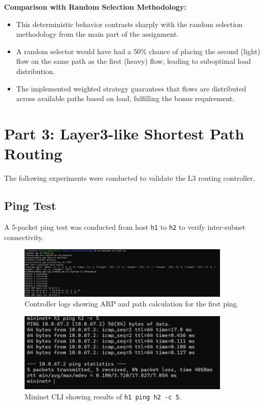 \documentclass[12pt]{article}
\begin{document}
\noindent \textbf{Comparison with Random Selection Methodology:}
\begin{itemize}
    \item This deterministic behavior contrasts sharply with the random selection methodology from the main part of the assignment. 
    \item A random selector would have had a 50\% chance of placing the second (light) flow on the same path as the first (heavy) flow, leading to suboptimal load distribution. 
    \item The implemented weighted strategy guarantees that flows are distributed across available paths based on load, fulfilling the bonus requirement.
    
\end{itemize}

\section{Part 3: Layer3-like Shortest Path Routing}

The following experiments were conducted to validate the L3 routing controller.

\subsection{Ping Test}
A 5-packet ping test was conducted from host \texttt{h1} to \texttt{h2} to verify inter-subnet connectivity.

\begin{figure}[h!]
    \centering
    \includegraphics[width=0.9\textwidth]{p3_ping_c.jpeg}
    \caption{Controller logs showing ARP and path calculation for the first ping.}
\end{figure}

\begin{figure}[h!]
    \centering
    \includegraphics[width=0.9\textwidth]{p3_ping_m.jpeg}
    \caption{Mininet CLI showing results of \texttt{h1 ping h2 -c 5}.}
\end{figure}
\end{document}
